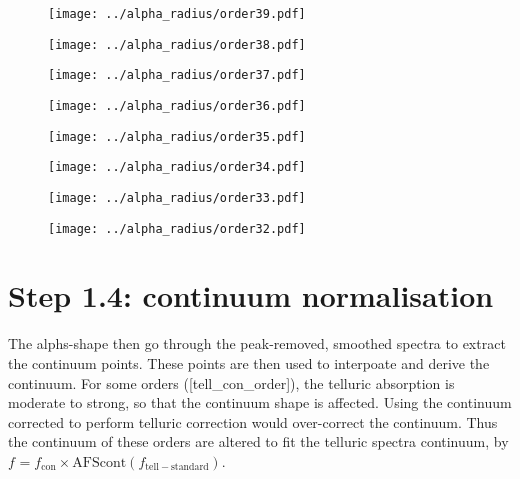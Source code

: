 \documentclass{article}
\begin{document}
\begin{figure}[H]
    \centering
    \texttt{[image: ../alpha\_radius/order39.pdf]}
\end{figure}
\begin{figure}[H]
    \centering
    \texttt{[image: ../alpha\_radius/order38.pdf]}
\end{figure}
\begin{figure}[H]
    \centering
    \texttt{[image: ../alpha\_radius/order37.pdf]}
\end{figure}
\begin{figure}[H]
    \centering
    \texttt{[image: ../alpha\_radius/order36.pdf]}
\end{figure}
\begin{figure}[H]
    \centering
    \texttt{[image: ../alpha\_radius/order35.pdf]}
\end{figure}
\begin{figure}[H]
    \centering
    \texttt{[image: ../alpha\_radius/order34.pdf]}
\end{figure}
\begin{figure}[H]
    \centering
    \texttt{[image: ../alpha\_radius/order33.pdf]}
\end{figure}
\begin{figure}[H]
    \centering
    \texttt{[image: ../alpha\_radius/order32.pdf]}
\end{figure}

\newpage

\section{Step 1.4: continuum normalisation}

The alphs-shape then go through the peak-removed, smoothed spectra to extract the continuum points.
These points are then used to interpoate and derive the continuum.
For some orders ([tell_con_order]), the telluric absorption is moderate to strong, so that the continuum shape is affected.
Using the continuum corrected to perform telluric correction would over-correct the continuum. 
Thus the continuum of these orders are altered to fit the telluric spectra continuum, by $f_\mathrm{} = f_\mathrm{con} \times \mathrm{AFScont}(f_\mathrm{tell-standard})$.
\end{document}
